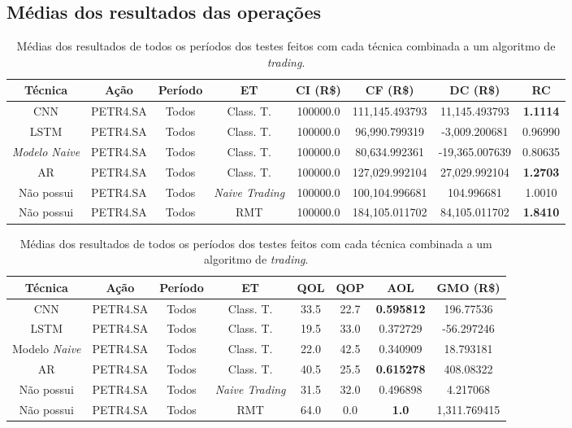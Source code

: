 \subsection{\textbf{Médias dos resultados das operações}}


\begin{table}[htp]
\scriptsize
\centering
\caption{Médias dos resultados de todos os períodos dos testes feitos com cada técnica combinada a um algoritmo de \textit{trading}.}
\begin{tabular}{cccccccc}
\hline
\textbf{Técnica} & \textbf{Ação} & \textbf{Período} & \textbf{ET} & \textbf{CI   (R\$)} & \textbf{CF   (R\$)} & \textbf{DC   (R\$)} & \textbf{RC} \\ \hline
CNN & PETR4.SA & Todos & Class.   T. & 100000.0 & 111,145.493793 & 11,145.493793 & \textbf{1.1114} \\
LSTM & PETR4.SA & Todos & Class.   T. & 100000.0 & 96,990.799319 & -3,009.200681 & 0.96990 \\
\textit{Modelo   Naive} & PETR4.SA & Todos & Class.   T. & 100000.0 & 80,634.992361 & -19,365.007639 & 0.80635 \\
AR & PETR4.SA & Todos & Class.   T. & 100000.0 & 127,029.992104 & 27,029.992104 & \textbf{1.2703} \\
Não   possui & PETR4.SA & Todos & \textit{Naive   Trading} & 100000.0 & 100,104.996681 & 104.996681 & 1.0010 \\
Não   possui & PETR4.SA & Todos & RMT & 100000.0 & 184,105.011702 & 84,105.011702 & \textbf{1.8410} \\ \hline
\end{tabular}
\end{table}


\begin{table}[htp]
\footnotesize
\centering
\caption{Médias dos resultados de todos os períodos dos testes feitos com cada técnica combinada a um algoritmo de \textit{trading}.}
\begin{tabular}{cccccccc}
\hline
\textbf{Técnica} & \textbf{Ação} & \textbf{Período} & \textbf{ET} & \textbf{QOL} & \textbf{QOP} & \textbf{AOL} & \textbf{GMO   (R\$)} \\ \hline
CNN & PETR4.SA & Todos & Class.   T. & 33.5 & 22.7 & \textbf{0.595812} & 196.77536 \\
LSTM & PETR4.SA & Todos & Class.   T. & 19.5 & 33.0 & 0.372729 & -56.297246 \\
Modelo   \textit{Naive} & PETR4.SA & Todos & Class.   T. & 22.0 & 42.5 & 0.340909 & 18.793181 \\
AR & PETR4.SA & Todos & Class.   T. & 40.5 & 25.5 & \textbf{0.615278} & 408.08322 \\
Não   possui & PETR4.SA & Todos & \textit{Naive   Trading} & 31.5 & 32.0 & 0.496898 & 4.217068 \\
Não   possui & PETR4.SA & Todos & RMT & 64.0 & 0.0 & \textbf{1.0} & 1,311.769415 \\ \hline
\end{tabular}
\end{table}

